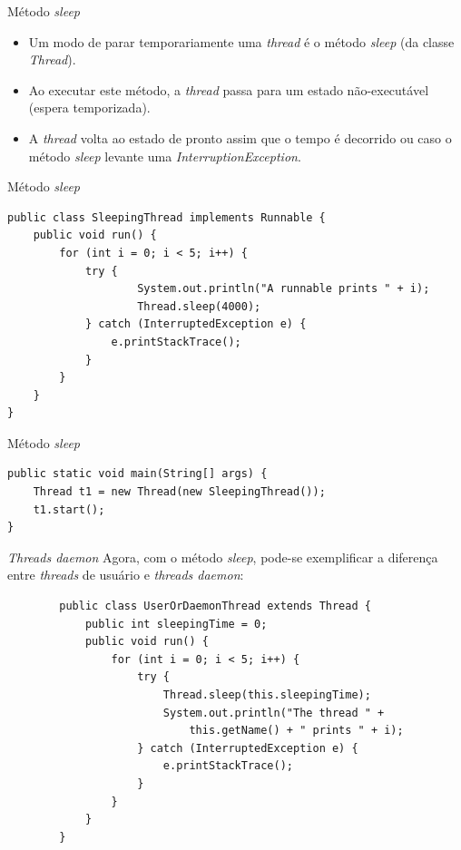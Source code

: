 \documentclass[11pt,justified]{beamer}
\begin{document}
\begin{frame}{Método \textit{sleep}}
    \begin{itemize}
        \item Um modo de parar temporariamente uma \textit{thread} é o método \textit{sleep} (da classe \textit{Thread}).
        \item Ao executar este método, a \textit{thread} passa para um estado não-executável (espera temporizada).
        \item A \textit{thread} volta ao estado de pronto assim que o tempo é decorrido ou caso o método \textit{sleep} levante uma \textit{InterruptionException}.
    \end{itemize}
\end{frame}

\begin{frame}[fragile]{Método \textit{sleep}}
    \begin{lstlisting}
public class SleepingThread implements Runnable {
    public void run() {
        for (int i = 0; i < 5; i++) {
            try {
                    System.out.println("A runnable prints " + i);
                    Thread.sleep(4000);
            } catch (InterruptedException e) {
                e.printStackTrace();
            }
        }
    }
}
    \end{lstlisting}
\end{frame}

\begin{frame}[fragile]{Método \textit{sleep}}
    \begin{lstlisting}
public static void main(String[] args) {
    Thread t1 = new Thread(new SleepingThread());
    t1.start();
}
    \end{lstlisting}
\end{frame}

\begin{frame}[fragile]{\textit{Threads daemon}}
    Agora, com o método \textit{sleep}, pode-se exemplificar a diferença entre \textit{threads} de usuário e \textit{threads daemon}:
    \begin{lstlisting}
        public class UserOrDaemonThread extends Thread {
            public int sleepingTime = 0;
            public void run() {
                for (int i = 0; i < 5; i++) {
                    try {
                        Thread.sleep(this.sleepingTime);
                        System.out.println("The thread " + 
                            this.getName() + " prints " + i);
                    } catch (InterruptedException e) {
                        e.printStackTrace();
                    }
                }
            }
        }
    \end{lstlisting}
\end{frame}
\end{document}
